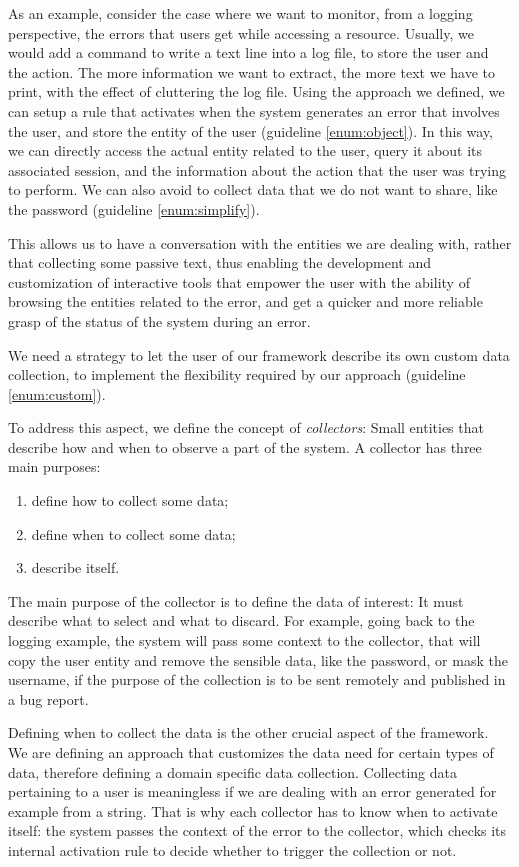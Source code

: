 As an example, consider the case where we want to monitor, from a logging perspective, the errors that users get while accessing a resource. Usually, we would add a command to write a text line into a log file, to store the user and the action. The more information we want to extract, the more text we have to print, with the effect of cluttering the log file. Using the approach we defined, we can setup a rule that activates when the system generates an error that involves the user, and store the entity of the user (guideline \ref{enum:object}). In this way, we can directly access the actual entity related to the user, query it about its associated session, and the information about the action that the user was trying to perform.
We can also avoid to collect data that we do not want to share, like the password (guideline \ref{enum:simplify}).

This allows us to have a conversation with the entities we are dealing with, rather that collecting some passive text, thus enabling the development and customization of interactive tools that empower the user with the ability of browsing the entities related to the error, and get a quicker and more reliable grasp of the status of the system during an error.

 We need a strategy to let the user of our framework describe its own custom data collection, to implement the flexibility required by our approach (guideline \ref{enum:custom}).

To address this aspect, we define the concept of \emph{collectors}: Small entities that describe how and when to observe a part of the system. A collector has three main purposes:

\begin{enumerate}
  \item define how to collect some data;
  \item define when to collect some data;
  \item describe itself.
\end{enumerate}

The main purpose of the collector is to define the data of interest: It must describe what to select and what to discard. For example, going back to the logging example, the system will pass some context to the collector, that will copy the user entity and remove the sensible data, like the password, or mask the username, if the purpose of the collection is to be sent remotely and published in a bug report.

Defining when to collect the data is the other crucial aspect of the framework. We are defining an approach that customizes the data need for certain types of data, therefore defining a domain specific data collection. Collecting data pertaining to a user is meaningless if we are dealing with an error generated for example from a string. That is why each collector has to know when to activate itself: the system passes the context of the error to the collector, which checks its internal activation rule to decide whether to trigger the collection or not.

